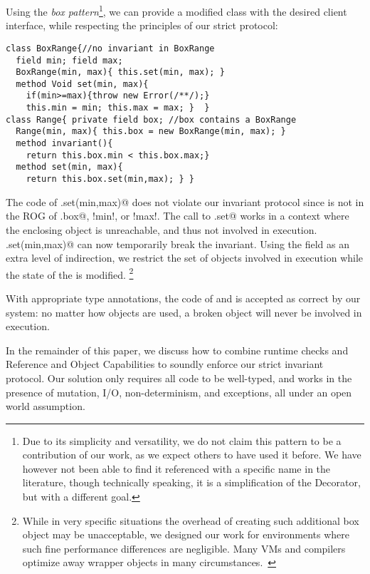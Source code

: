 Using the \emph{box pattern}\footnote{Due to its simplicity and versatility, we do not claim this pattern to be a contribution of our work, as we expect others to have used it before. We have however not been able to find it referenced with a specific name in the literature, though technically speaking, it is a simplification of the Decorator, but with a different goal.}, we can provide a modified
\Q@Range@ class with the desired client interface, while respecting the principles of our strict protocol:
\begin{lstlisting}
class BoxRange{//no invariant in BoxRange
  field min; field max;
  BoxRange(min, max){ this.set(min, max); }
  method Void set(min, max){
    if(min>=max){throw new Error(/**/);}
    this.min = min; this.max = max; }  }
class Range{ private field box; //box contains a BoxRange
  Range(min, max){ this.box = new BoxRange(min, max); }
  method invariant(){
    return this.box.min < this.box.max;}
  method set(min, max){
    return this.box.set(min,max); } }
\end{lstlisting}
The code of \Q@Range.set(min,max)@ does not violate our invariant protocol since \Q@this@ is not in the ROG of \Q@this.box@, \Q!min!, or \Q!max!. The call to
\Q@BoxRange.set@ works in a context where the enclosing \Q@Range@ object is
unreachable, and thus not involved in execution.  \Q@Range.set(min,max)@ can now temporarily break the \Q@Range@ invariant.
Using the \Q@box@ field as an extra level of indirection, we restrict the set of objects involved in execution while the state of the \Q@Range@ is modified.
\footnote{While in very specific situations the overhead of creating such additional box object may be unacceptable, 
we designed our work for environments where such fine performance differences are negligible.
Many VMs and compilers optimize away wrapper objects in many circumstances.~\cite{help}} %

With appropriate type annotations, the code of \Q@Range@ and \Q@BoxRange@ is accepted as correct by our system: no matter how \Q@Range@ objects are used, a broken \Q@Range@ object will never be involved in execution.

In the remainder of this paper, we discuss how to combine runtime checks and Reference and Object Capabilities
to soundly enforce our strict invariant protocol.
Our solution only requires all code to be well-typed, and works in the presence of mutation, I/O, non-determinism, and exceptions, all under an open world assumption.

